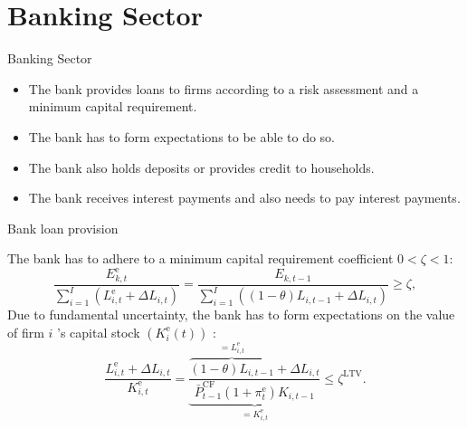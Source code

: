 \documentclass[9pt]{beamer}
\begin{document}
\section{Banking Sector}
\begin{frame}{Banking Sector}
\label{Bank}

\begin{itemize}
    \item The bank provides loans to firms according to a risk assessment and a minimum capital requirement.
    \item The bank has to form expectations to be able to do so.
    \item The bank also holds deposits or provides credit to households.
    \item The bank receives interest payments and also needs to pay interest payments.
\end{itemize}
    \hyperlink{ReturnOverview}{}

\end{frame}
\begin{frame}{Bank loan provision}

    The bank has to adhere to a minimum capital requirement coefficient $0<\zeta<1$:
\begin{equation}
\frac{E_{k,t}^{\mathrm{e}}}{\sum_{i=1}^I\left(L_{i,t}^{\mathrm{e}}+\Delta L_{i,t}\right)}=\frac{E_{k,t-1}}{\sum_{i=1}^I\left((1-\theta) L_{i,t-1}+\Delta L_{i,t}\right)} \geq \zeta,
\end{equation}
Due to fundamental uncertainty, the bank has to form expectations on the value of firm $i$ 's capital stock $\left(K_i^{\mathrm{e}}(t)\right)$ :
\begin{equation}
\frac{L_{i,t}^{\mathrm{e}}+\Delta L_{i,t}}{K_{i,t}^{\mathrm{e}}}=\underbrace{\frac{\overbrace{(1-\theta) L_{i,t-1}}^{=L_{i,t}^{\mathrm{e}}}+\Delta L_{i,t}}{\bar{P}^{\mathrm{CF}}_{t-1}\left(1+\pi_t^{\mathrm{e}}\right) K_{i,t-1}}}_{=K_{i,t}^{\mathrm{e}}} \leq \zeta^{\mathrm{LTV}} .
\end{equation}
      \hyperlink{ReturnOverview}{}
\end{frame}
\end{document}
